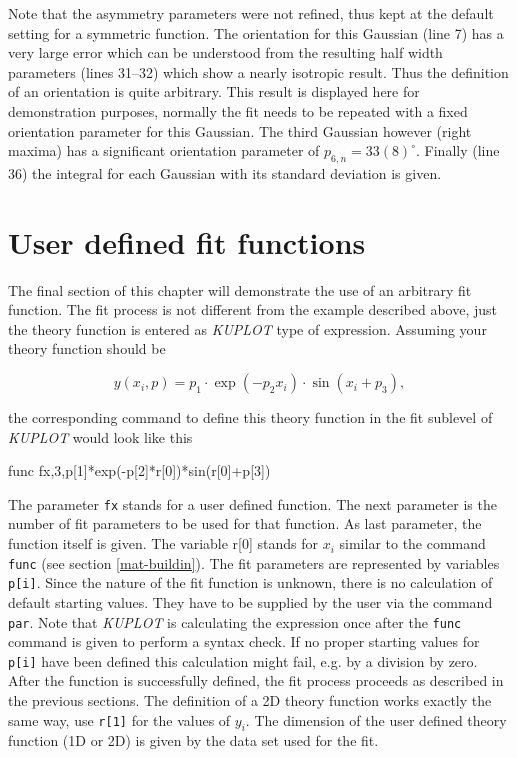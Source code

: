 Note that the asymmetry parameters were not refined, thus kept at the
default setting for a symmetric function.  The orientation for this
Gaussian (line 7) has a very large error which can be understood from the
resulting half width parameters (lines 31--32) which show a nearly isotropic
result.  Thus the definition of an orientation is quite arbitrary.  This
result is displayed here for demonstration purposes, normally the fit needs
to be repeated with a fixed orientation parameter for this Gaussian.  The
third Gaussian however (right maxima) has a significant orientation
parameter of $p_{6,n} = 33(8)^{\circ}$.  Finally (line 36) the integral for
each Gaussian with its standard deviation is given.


\section{User defined fit functions \label{fit-user}}

The final section of this chapter will demonstrate the use of an
arbitrary fit function. The fit process is not
different from the example described above, just the theory function is
entered as {\it KUPLOT} type of expression. Assuming your theory
function should be

\begin{equation}
    y(x_{i},p) = p_{1} \cdot \exp(- p_{2}x_{i}) \cdot \sin(x_{i}+p_{3}),
    \nonumber
\end{equation}

the corresponding command to define this theory function in the fit
sublevel of {\it KUPLOT} would look like this

\begin{MacVerbatim}
    func fx,3,p[1]*exp(-p[2]*r[0])*sin(r[0]+p[3])
\end{MacVerbatim}

The parameter {\tt fx} stands for a user defined function. The next
parameter is the number of fit parameters to be used for that
function. As last parameter, the function itself is given. The
variable r[0] stands for $x_{i}$ similar to the command {\tt func}
(see section \ref{mat-buildin}). The fit parameters are represented
by variables {\tt p[i]}. Since the nature of the fit function is
unknown, there is no calculation of default starting values. They
have to be supplied by the user via the command {\tt par}. Note that
{\it KUPLOT} is calculating the expression once after the {\tt func}
command is given to perform a syntax check. If no proper starting
values for {\tt p[i]} have been defined this calculation might fail,
e.g. by a division by zero. After the function is successfully
defined, the fit process proceeds as described in the previous
sections. The definition of a 2D theory function works exactly the
same way, use {\tt r[1]} for the values of $y_{i}$. The dimension of
the user defined theory function (1D or 2D) is given by the data set
used for the fit. \par

